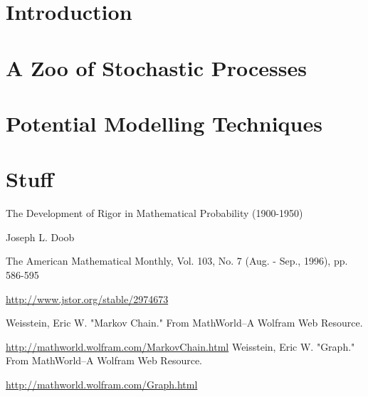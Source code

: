 \documentclass{report}
\begin{document}


\tableofcontents

\chapter{Introduction}



\chapter{A Zoo of Stochastic Processes}



\chapter{Potential Modelling Techniques}



\appendix
\chapter{Stuff}

\begin{thebibliography}{9}

	The Development of Rigor in Mathematical Probability (1900-1950)

	Joseph L. Doob

	The American Mathematical Monthly, Vol. 103, No. 7 (Aug. - Sep., 1996), pp. 586-595

	\url{http://www.jstor.org/stable/2974673}

	Weisstein, Eric W. "Markov Chain." From MathWorld--A Wolfram Web Resource. 

	\url{http://mathworld.wolfram.com/MarkovChain.html}
	Weisstein, Eric W. "Graph." From MathWorld--A Wolfram Web Resource. 
	
	\url{http://mathworld.wolfram.com/Graph.html}

\end{thebibliography}
\end{document}
